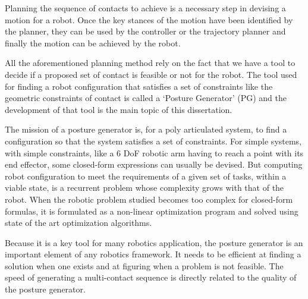 Planning the sequence of contacts to achieve is a necessary step in devising a motion for a robot.
Once the key stances of the motion have been identified by the planner, they can be used by the controller or the trajectory planner and finally the motion can be achieved by the robot.

All the aforementioned planning method rely on the fact that we have a tool to decide if a proposed set of contact is feasible or not for the robot.
The tool used for finding a robot configuration that satisfies a set of constraints like the geometric constraints of contact is called a `Posture Generator' (PG) and the development of that tool is the main topic of this dissertation.

The mission of a posture generator is, for a poly articulated system, to find a configuration so that the system satisfies a set of constraints.
For simple systems, with simple constraints, like a 6 DoF robotic arm having to reach a point with its end effector, some closed-form expressions can usually be devised.
But computing robot configuration to meet the requirements of a given set of tasks, within a viable state, is a recurrent problem whose complexity grows with that of the robot.
When the robotic problem studied becomes too complex for closed-form formulas, it is formulated as a non-linear optimization program and solved using state of the art optimization algorithms.

Because it is a key tool for many robotics application, the posture generator is an important element of any robotics framework.
It needs to be efficient at finding a solution when one exists and at figuring when a problem is not feasible.
The speed of generating a multi-contact sequence is directly related to the quality of the posture generator.

